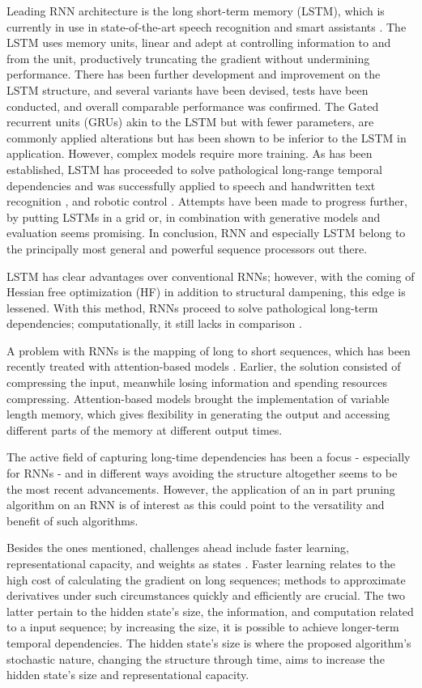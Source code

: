 Leading RNN architecture is the long short-term memory \cite{LSTM} (LSTM), which is currently in use in state-of-the-art speech recognition and smart assistants \cite{Apple}. The LSTM uses memory units, linear and adept at controlling information to and from the unit, productively truncating the gradient without undermining performance. There has been further development and improvement on the LSTM structure, and several variants have been devised, tests have been conducted, and overall comparable performance was confirmed\cite{Greff}. The Gated recurrent units (GRUs) akin to the LSTM but with fewer parameters, are commonly applied alterations but has been shown to be inferior to the LSTM in application. However, complex models require more training. As has been established, LSTM has proceeded to solve pathological long-range temporal dependencies and was successfully applied to speech and handwritten text recognition \cite{gs, gas}, and robotic control \cite{mayer}. Attempts have been made to progress further, by putting LSTMs in a grid\cite{ka} or, in combination with generative models and evaluation seems promising\cite{gr, ch, bo}. In conclusion, RNN and especially LSTM belong to the principally most general and powerful sequence processors out there.

LSTM has clear advantages over conventional RNNs; however, with the coming of Hessian free optimization (HF) in addition to structural dampening, this edge is lessened. With this method, RNNs proceed to solve pathological long-term dependencies; computationally, it still lacks in comparison \cite{suts}. 

A problem with RNNs is the mapping of long to short sequences, which has been recently treated with attention-based models \cite{xu}. Earlier, the solution consisted of compressing the input, meanwhile losing information and spending resources compressing. Attention-based models brought the implementation of variable length memory, which gives flexibility in generating the output and accessing different parts of the memory at different output times. 

The active field of capturing long-time dependencies has been a focus - especially for RNNs - and in different ways avoiding the structure altogether seems to be the most recent advancements. However, the application of an in part pruning algorithm on an RNN is of interest as this could point to the versatility and benefit of such algorithms.

Besides the ones mentioned, challenges ahead include faster learning, representational capacity, and weights as states \cite{suts}. Faster learning relates to the high cost of calculating the gradient on long sequences; methods to approximate derivatives under such circumstances quickly and efficiently are crucial. The two latter pertain to the hidden state's size, the information, and computation related to a input sequence; by increasing the size, it is possible to achieve longer-term temporal dependencies. The hidden state's size is where the proposed algorithm's stochastic nature, changing the structure through time, aims to increase the hidden state's size and representational capacity.

